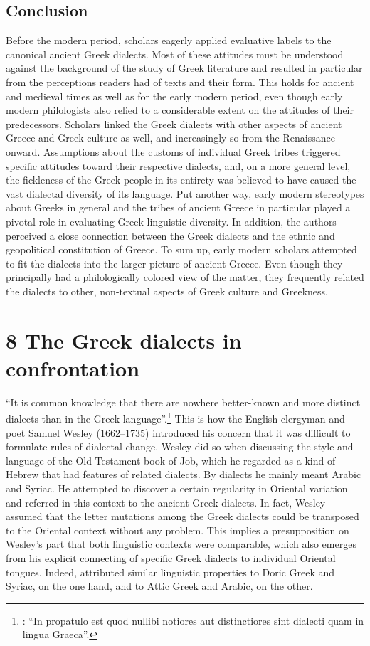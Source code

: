 \documentclass[output=paper]{langsci/langscibook}
\begin{document}
\subsection{Conclusion}
\hypertarget{Toc19704856}{}
Before the modern period, scholars eagerly applied evaluative labels to the canonical ancient Greek dialects. Most of these attitudes must be understood against the background of the study of Greek literature and resulted in particular from the perceptions readers had of texts and their form. This holds for ancient and medieval times as well as for the early modern period, even though early modern philologists also relied to a considerable extent on the attitudes of their predecessors. Scholars linked the Greek dialects with other aspects of ancient Greece and Greek culture as well, and increasingly so from the Renaissance onward. Assumptions about the customs of individual Greek tribes triggered specific attitudes toward their respective dialects, and, on a more general level, the fickleness of the Greek people in its entirety was believed to have caused the vast dialectal diversity of its language. Put another way, early modern stereotypes about Greeks in general and the tribes of ancient Greece in particular played a pivotal role in evaluating Greek linguistic diversity. In addition, the authors perceived a close connection between the Greek dialects and the ethnic and geopolitical constitution of Greece. To sum up, early modern scholars attempted to fit the dialects into the larger picture of ancient Greece. Even though they principally had a philologically colored view of the matter, they frequently related the dialects to other, non-textual aspects of Greek culture and Greekness.

\section{\textsc{8} The Greek dialects in confrontation}
\hypertarget{Toc19704857}{}
“It is common knowledge that there are nowhere better-known and more distinct dialects than in the Greek language”.\footnote{\citet[23]{Wesley1736}: “In propatulo est quod nullibi notiores aut distinctiores sint dialecti quam in lingua Graeca”.} This is how the English clergyman and poet Samuel Wesley (1662–1735) introduced his concern that it was difficult to formulate rules of dialectal change. Wesley did so when discussing the style and language of the Old Testament book of Job, which he regarded as a kind of Hebrew that had features of related dialects. By dialects he mainly meant Arabic and Syriac. He attempted to discover a certain regularity in Oriental variation and referred in this context to the ancient Greek dialects. In fact, Wesley assumed that the letter mutations among the Greek dialects could be transposed to the Oriental context without any problem. This implies a presupposition on Wesley’s part that both linguistic contexts were comparable, which also emerges from his explicit connecting of specific Greek dialects to individual Oriental tongues. Indeed, \citet[24]{Wesley1736} attributed similar linguistic properties to Doric Greek and Syriac, on the one hand, and to Attic Greek and Arabic, on the other.
\end{document}
